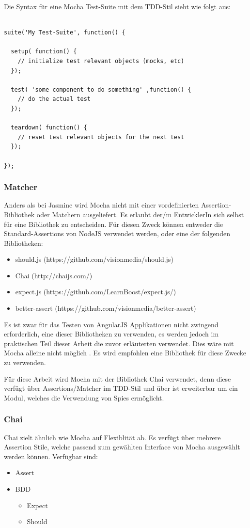 Die Syntax für eine Mocha Test-Suite mit dem TDD-Stil sieht wie folgt aus:
\begin{lstlisting}

suite('My Test-Suite', function() {

  setup( function() {
    // initialize test relevant objects (mocks, etc)
  });

  test( 'some component to do something' ,function() {
    // do the actual test
  });

  teardown( function() {
    // reset test relevant objects for the next test
  });

});

\end{lstlisting}

\subsubsection{Matcher}
Anders als bei Jasmine wird Mocha nicht mit einer vordefinierten Assertion-Bibliothek oder Matchern ausgeliefert. Es erlaubt der/m EntwicklerIn sich selbst für eine Bibliothek zu entscheiden. Für diesen Zweck können entweder die Standard-Assertions von NodeJS verwendet werden, oder eine der folgenden Bibliotheken:

\begin{itemize}
  \item should.js (https://github.com/visionmedia/should.js)
  \item Chai (http://chaijs.com/)
  \item expect.js (https://github.com/LearnBoost/expect.js/)
  \item better-assert (https://github.com/visionmedia/better-assert)
\end{itemize}

Es ist zwar für das Testen von AngularJS Applikationen nicht zwingend erforderlich, eine dieser Bibliotheken zu verwenden, es werden jedoch im praktischen Teil dieser Arbeit die zuvor erläuterten  verwendet. Dies wäre mit Mocha alleine nicht möglich \autocite{Mocha:Spies}. Es wird empfohlen eine Bibliothek für diese Zwecke zu verwenden.

Für diese Arbeit wird Mocha mit der Bibliothek Chai verwendet, denn diese verfügt über Assertions/Matcher im TDD-Stil und über ist erweiterbar um ein Modul, welches die Verwendung von Spies ermöglicht.

\subsubsection{Chai}
Chai zielt ähnlich wie Mocha auf Flexiblität ab. Es verfügt über mehrere Assertion Stile, welche passend zum gewählten Interface von Mocha ausgewählt werden können.
Verfügbar sind:
\begin{itemize}
  \item Assert
  \item BDD
  \begin{itemize}
    \item Expect
    \item Should
  \end{itemize}
\end{itemize}

